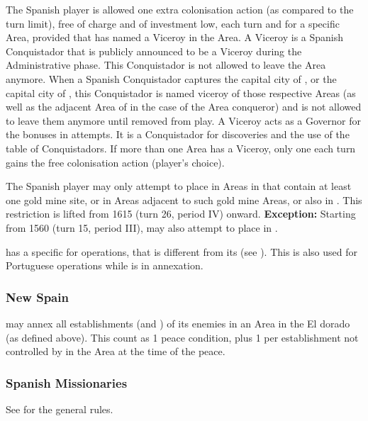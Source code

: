\aparag[Viceroys] The Spanish player is allowed one extra colonisation
action (as compared to the turn limit), free of charge and of investment
low, each turn and for a specific Area, provided that \SPA has named a
Viceroy in the Area.
\bparag A Viceroy is a Spanish Conquistador that is publicly announced
to be a Viceroy during the Administrative phase. This Conquistador is
not allowed to leave the Area anymore.
\bparag When a Spanish Conquistador captures the  capital
city of , or the  capital city of
, this Conquistador is named viceroy of those respective
Areas (as well as the adjacent Area of  in the
case of the  Area conqueror) and is not allowed to leave
them anymore until removed from play.
\bparag A Viceroy acts as a Governor for the bonuses in \COL
attempts. It is a Conquistador for discoveries and the use of the table
of Conquistadors.
\bparag If more than one Area has a Viceroy, only one each turn gains
the free colonisation action (player's choice).

\aparag[El Dorado] The Spanish player may only attempt to place \COL in
Areas in  that contain at least one gold mine site,
or in Areas adjacent to such gold mine Areas, or also in
.
\bparag This restriction is lifted from 1615 (turn 26, period IV)
onward.
\bparag \textbf{Exception:} Starting from 1560 (turn 15, period III),
\HIS may also attempt to place \COL in \granderegionPhilippines.

 \SPA has a specific \FTI for \COL
operations, that is different from its \FTI (see
).
\bparag This \FTI is also used for Portuguese \COL operations while
 is in annexation.

\subsubsection{New Spain}
\aparag \HIS may annex all establishments (\COL and \TP) of its enemies
in an Area in the El dorado (as defined above).
\bparag This count as 1 peace condition, plus 1 per establishment not
controlled by \SPA in the Area at the time of the peace.

\subsubsection{Spanish Missionaries}
\aparag See  for the general rules.

